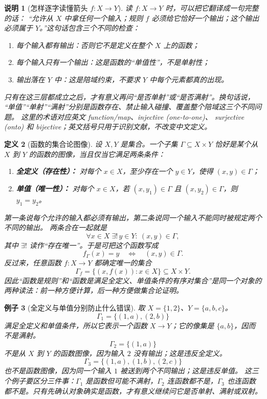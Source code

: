 \documentclass[UTF8,fontset=none,a4paper,11pt]{ctexart}
\theoremstyle{foundation-definition}
\newtheorem{definition}{定义}[section]
\theoremstyle{foundation-theorem}
\theoremstyle{foundation-proposition}
\theoremstyle{foundation-example}
\newtheorem{example}[definition]{例子}
\theoremstyle{foundation-remark}
\newtheorem{remark}[definition]{说明}
\theoremstyle{foundation-theorem}
\begin{document}
\begin{remark}[怎样逐字读懂箭头 \(f:X\to Y\)]\label{rem:map-arrow-reading}
读 \(f:X\to Y\) 时，可以把它翻译成一句完整的话：
“允许从 \(X\) 中拿任何一个输入；规则 \(f\) 必须给它恰好一个输出；这个输出必须属于
\(Y\)。”这句话包含三个不同的检查：
\begin{enumerate}[label=(\arabic*)]
  \item 每个输入都有输出：否则它不是定义在整个 \(X\) 上的函数；
  \item 每个输入只有一个输出：这是函数的“单值性”，不是单射性；
  \item 输出落在 \(Y\) 中：这是陪域约束，不要求 \(Y\) 中每个元素都真的出现。
\end{enumerate}
只有在这三层都成立之后，才有意义再问“是否单射”或“是否满射”。换句话说，
“单值”“单射”“满射”分别是函数存在、禁止输入碰撞、覆盖整个陪域这三个不同问题。
这里的术语对应英文 \emph{function/map}、\emph{injective (one-to-one)}、
\emph{surjective (onto)} 和 \emph{bijective}；英文括号只用于识别文献，不改变中文定义。
\end{remark}

\begin{definition}[函数的集合论图像]\label{def:function-graph-formal}
设 \(X,Y\) 是集合。一个子集 \(\Gamma\subseteq X\times Y\) 恰好是某个从 \(X\) 到 \(Y\) 的函数的图像，当且仅当它满足两条条件：
\begin{enumerate}[label=(\alph*)]
  \item \textbf{全定义（存在性）：} 对每个 \(x\in X\)，至少存在一个 \(y\in Y\)，使得 \((x,y)\in\Gamma\)；
  \item \textbf{单值（唯一性）：} 对每个 \(x\in X\)，若 \((x,y_1)\in\Gamma\) 且 \((x,y_2)\in\Gamma\)，则 \(y_1=y_2\)。
\end{enumerate}
第一条说每个允许的输入都必须有输出，第二条说同一个输入不能同时被规定两个不同的输出。
两条合在一起就是
\[
  \forall x\in X\;\exists!\,y\in Y:\ (x,y)\in\Gamma,
\]
其中 \(\exists!\) 读作“存在唯一”。于是可把这个函数写成
\[
  f_\Gamma(x)=y\quad\Longleftrightarrow\quad (x,y)\in\Gamma.
\]
反过来，任意函数 \(f:X\to Y\) 都确定唯一的集合
\[
  \Gamma_f=\{(x,f(x)):x\in X\}\subseteq X\times Y.
\]
因此“函数是规则”和“函数是满足全定义、单值条件的有序对集合”是同一个对象的两种读法：前一种方便计算，后一种方便做集合论证明。
\end{definition}

\begin{example}[全定义与单值分别防止什么错误]
取 \(X=\{1,2\}\)、\(Y=\{a,b,c\}\)。
\[
  \Gamma_1=\{(1,a),(2,b)\}
\]
满足全定义和单值条件，所以它表示一个函数 \(X\to Y\)；它的像集是 \(\{a,b\}\)，因而不是满射。
\[
  \Gamma_2=\{(1,a)\}
\]
不是从 \(X\) 到 \(Y\) 的函数图像，因为输入 \(2\) 没有输出；这是违反全定义。
\[
  \Gamma_3=\{(1,a),(1,b),(2,c)\}
\]
也不是函数图像，因为同一个输入 \(1\) 被送到两个不同输出；这是违反单值。
这三个例子要区分三件事：\(\Gamma_1\) 是函数但可能不满射，\(\Gamma_2\) 连函数都不是，\(\Gamma_3\) 也连函数都不是。只有先确认对象确实是函数，才有意义继续问它是否单射、满射或双射。
\end{example}
\end{document}
